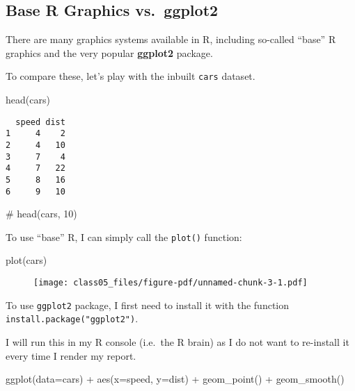 \documentclass[
  letterpaper,
  DIV=11,
  numbers=noendperiod]{scrartcl}
\newenvironment{Shaded}{\begin{snugshade}}{\end{snugshade}}
\newcommand{\AttributeTok}[1]{\textcolor[rgb]{0.40,0.45,0.13}{#1}}
\newcommand{\CommentTok}[1]{\textcolor[rgb]{0.37,0.37,0.37}{#1}}
\newcommand{\FunctionTok}[1]{\textcolor[rgb]{0.28,0.35,0.67}{#1}}
\newcommand{\NormalTok}[1]{\textcolor[rgb]{0.00,0.23,0.31}{#1}}
\newcommand{\SpecialCharTok}[1]{\textcolor[rgb]{0.37,0.37,0.37}{#1}}
\begin{document}
\hypertarget{base-r-graphics-vs.-ggplot2}{%
\subsection{Base R Graphics
vs.~ggplot2}\label{base-r-graphics-vs.-ggplot2}}

There are many graphics systems available in R, including so-called
``base'' R graphics and the very popular \textbf{ggplot2} package.

To compare these, let's play with the inbuilt \texttt{cars} dataset.

\begin{Shaded}
\begin{Highlighting}[]
\FunctionTok{head}\NormalTok{(cars)}
\end{Highlighting}
\end{Shaded}

\begin{verbatim}
  speed dist
1     4    2
2     4   10
3     7    4
4     7   22
5     8   16
6     9   10
\end{verbatim}

\begin{Shaded}
\begin{Highlighting}[]
\CommentTok{\# head(cars, 10)}
\end{Highlighting}
\end{Shaded}

To use ``base'' R, I can simply call the \texttt{plot()} function:

\begin{Shaded}
\begin{Highlighting}[]
\FunctionTok{plot}\NormalTok{(cars)}
\end{Highlighting}
\end{Shaded}

\begin{figure}[H]

{\centering \texttt{[image: class05\_files/figure-pdf/unnamed-chunk-3-1.pdf]}

}

\end{figure}

To use \texttt{ggplot2} package, I first need to install it with the
function \texttt{install.package("ggplot2")}.

I will run this in my R console (i.e.~the R brain) as I do not want to
re-install it every time I render my report.

\begin{Shaded}
\begin{Highlighting}[]
\FunctionTok{ggplot}\NormalTok{(}\AttributeTok{data=}\NormalTok{cars) }\SpecialCharTok{+}
  \FunctionTok{aes}\NormalTok{(}\AttributeTok{x=}\NormalTok{speed, }\AttributeTok{y=}\NormalTok{dist) }\SpecialCharTok{+}
  \FunctionTok{geom\_point}\NormalTok{() }\SpecialCharTok{+}
  \FunctionTok{geom\_smooth}\NormalTok{()}
\end{Highlighting}
\end{Shaded}
\end{document}
